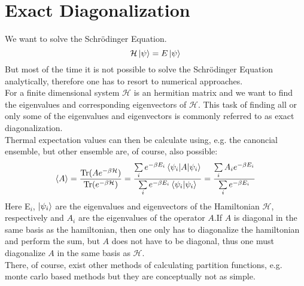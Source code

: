 \documentclass{article}
\begin{document}
\section{Exact Diagonalization}
We want to solve the Schr\"odinger Equation.
\begin{equation}
\label{eq:1}
\mathcal{H} \ket{\psi} = E \ket{\psi}
\end{equation}
But most of the time it is not possible to solve the Schr\"odinger
Equation analytically, therefore one has to resort to numerical
approaches.\\
For a finite dimensional system $\mathcal{H}$ is an hermitian matrix
and we want to find the eigenvalues and corresponding eigenvectors of $\mathcal{H}$.
This task of finding all or only some of the eigenvalues and
eigenvectors is commonly referred to as exact diagonalization.\\
Thermal expectation values can then be calculate using, e.g. the
canoncial ensemble, but other ensemble are, of course, also possible:
\begin{equation}
\label{eq:2}
\braket{A} = \frac{ \text{Tr}(Ae^{-\beta \mathcal H})}{ \text{Tr}(e^{-\beta \mathcal
    H})} = \frac{\sum\limits_i e^{-\beta
      E_{i}} \braket{\psi_i|A|\psi_{i}}}{\sum\limits_i e^{-\beta
      E_i} \braket{\psi_i|\psi_{i}}} = \frac{\sum\limits_i A_i e^{-\beta
      E_{i}}}{\sum\limits_i e^{-\beta
      E_i}}
\end{equation}
Here E$_{i}$, $\ket{\psi_i}$ are the eigenvalues and  eigenvectors of
the Hamiltonian $\mathcal{H}$, respectively and $A_i$ are the
eigenvalues of the operator $A$.If $A$ is diagonal in the same basis as
the hamiltonian, then one only has to diagonalize the hamiltonian and
perform the sum, but $A$ does not have to be diagonal, thus one must
diagonalize $A$ in the same basis as $\mathcal{H}$.\\
There, of course, exist other methods
of calculating partition functions, e.g. monte carlo based methods but they
are conceptually not as simple.
\end{document}
